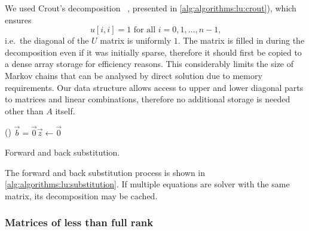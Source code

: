 We used Crout's  decomposition%
~\citep[Section~2.3.1]{press2007numerical}, presented in
\vref{alg:algorithms:lu:crout}), which ensures
\begin{equation}
  u[i, i] = 1 \text{ for all $i = 0, 1, \ldots, n - 1$,}
\end{equation}
i.e.~the diagonal of the $U$ matrix is uniformly $1$. The matrix is
filled in during the decomposition even if it was initially sparse,
therefore it should first be copied to a dense array storage for
efficiency reasons. This considerably limits the size of Markov chains that
can be analysed by direct solution due to memory requirements. Our
data structure allows access to upper and lower diagonal parts to
matrices and linear combinations, therefore no additional storage is
needed other than $A$ itself.

\begin{algorithm}
  \;
  \lIf()
  {$\vec{b} = \vec{0}$}{$\vec{z} \gets \vec{0}$}
   
  \;
  \caption{Forward and back substitution.}
  \label{alg:algorithms:lu:substitution}
\end{algorithm}

The forward and back substitution process is shown in
\vref{alg:algorithms:lu:substitution}. If multiple equations are
solver with the same matrix, its  decomposition may be
cached.

\subsubsection{Matrices of less than full rank}

